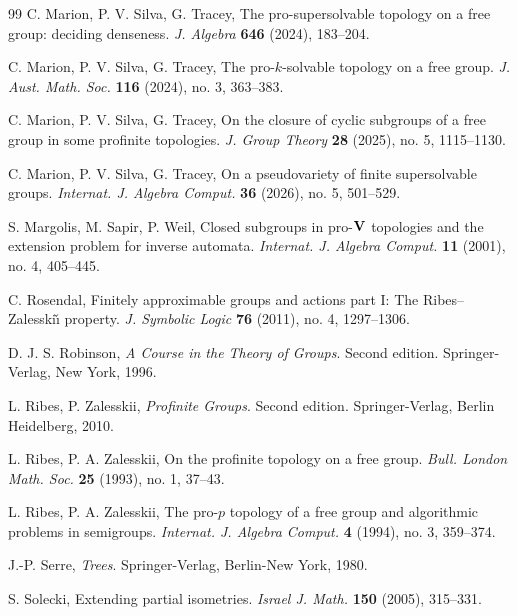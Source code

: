 \documentclass[10pt,a4paper]{amsart}
\theoremstyle{definition}
\theoremstyle{definition}
\numberwithin{equation}{section}
\begin{document}
\begin{thebibliography}{99}
C. Marion, P. V. Silva, G. Tracey,
The pro-supersolvable topology on a free group: deciding denseness.
\textit{J. Algebra} {\bf 646} (2024), 183--204.

C. Marion, P. V. Silva, G. Tracey,
The pro-$k$-solvable topology on a free group.
\textit{J. Aust. Math. Soc.} {\bf 116} (2024), no. 3, 363--383.

C. Marion, P. V. Silva, G. Tracey,
On the closure of cyclic subgroups of a free group in some profinite topologies.
\textit{J. Group Theory} {\bf 28} (2025), no. 5, 1115--1130.

C. Marion, P. V. Silva, G. Tracey,
On a pseudovariety of finite supersolvable groups.
\textit{Internat. J. Algebra Comput.} {\bf 36} (2026), no. 5, 501--529.


S. Margolis, M. Sapir, P. Weil,
Closed subgroups in pro-${\bf V}$ topologies and the extension problem for inverse automata.
\textit{Internat. J. Algebra Comput.} {\bf 11} (2001), no. 4, 405--445.

C. Rosendal,
Finitely approximable groups and actions part I: The Ribes--Zalesski\v{\i} property. 
\textit{J. Symbolic Logic} {\bf 76} (2011), no. 4, 1297--1306.

D. J. S. Robinson,
\textit{A Course in the Theory of Groups}. Second edition. Springer-Verlag, New York, 1996.

L. Ribes, P. Zalesskii,
\textit{Profinite Groups}. Second edition. Springer-Verlag, Berlin Heidelberg, 2010.

L. Ribes, P. A. Zalesskii, 
On the profinite topology on a free group. \textit{Bull. London Math. Soc.} {\bf 25} (1993), no. 1, 37--43.

L. Ribes, P. A. Zalesskii,
The pro-$p$ topology of a free group and algorithmic problems in semigroups.
\textit{Internat. J. Algebra Comput.} {\bf 4} (1994), no. 3, 359--374.





J.-P. Serre, 
\textit{Trees}.
Springer-Verlag, Berlin-New York, 1980.

S. Solecki,
Extending partial isometries.
\textit{Israel J. Math.} {\bf 150} (2005), 315--331.


\end{thebibliography}
\end{document}
